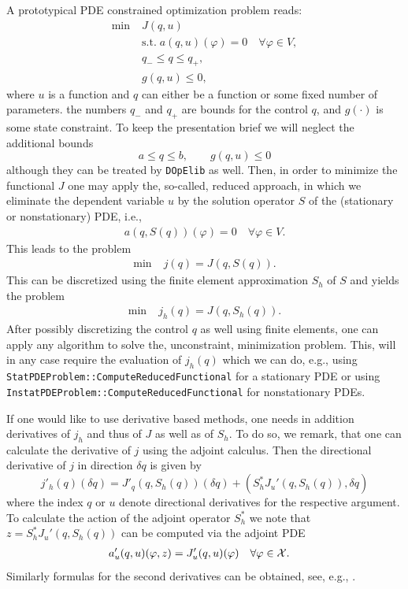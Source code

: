 \documentclass[smallextended]{svjour3}       %
\numberwithin{equation}{section}
\renewcommand{\phi}{\varphi}
\newcommand{\dope}{\texttt{DOpElib}}
\begin{document}
A prototypical PDE constrained optimization problem reads:
\begin{align*}
\min\;&J(q,u) \\
  &\text{s.t.}\; a(q,u)(\phi) = 0 \quad \forall \phi\in V,\\
  &q_- \le q \le q_+,\\
  &g(q,u) \le 0,  
\end{align*}
where $u$ is a function and $q$ can either be a function or some 
fixed number of parameters. the numbers $q_-$ and $q_+$ are bounds for 
the control $q$, and $g(\cdot)$ is some state constraint.
To keep the presentation brief we will neglect the additional bounds
\[
a \le q \le b,\qquad g(q,u) \le 0
\]
although they can be treated by \dope{} as well.
Then, in order to minimize the functional $J$ one may apply the, so-called, 
reduced approach, in which we eliminate the dependent variable $u$ by the solution 
operator $S$ of the (stationary or nonstationary) PDE, i.e., 
\begin{align*}
a(q,S(q))(\phi) = 0 \quad \forall \phi\in V. 
\end{align*}
This leads to the problem
\begin{align*}
\min\;&j(q) = J(q,S(q)). 
\end{align*}
This can be discretized using the finite element approximation $S_h$ of $S$ 
and yields the problem 
\begin{align*}
\min\;&j_h(q) = J(q,S_h(q)). 
\end{align*}
After possibly discretizing the control $q$ as well using finite elements, 
one can apply any algorithm to solve the, unconstraint, minimization 
problem. This, will in any case require the evaluation of $j_h(q)$ which 
we can do, e.g., using \texttt{StatPDEProblem::ComputeReducedFunctional} for 
a stationary PDE or using \texttt{InstatPDEProblem::ComputeReducedFunctional} 
for nonstationary PDEs. 

If one would like to use derivative based methods, one 
needs in addition derivatives of $j_h$ and thus of $J$ as well as of $S_h$. 
To do so, we remark, that one can calculate the derivative of 
$j$ using the adjoint calculus. Then the directional derivative 
of $j$ in direction $\delta q$ is given by
\[
j'_h(q)(\delta q) = J'_q(q,S_h(q))(\delta q) + (S_h^* J_u'(q,S_h(q)),\delta q)
\]
where the index $q$ or $u$ denote directional derivatives for the 
respective argument. To calculate the action of the adjoint operator $S_h^*$ 
we note that $z =  S_h^* J_u'(q,S_h(q))$
can be computed via the adjoint PDE
\begin{equation}
  \label{opt_KKT_system}
  \begin{aligned}
    a_{u}'(q,u)(\phi , z) &= J'_{u}(q,u)(\phi) & \forall \phi&\in {\cal X}.
  \end{aligned}
\end{equation}
Similarly formulas for the second derivatives can be obtained, see, e.g., 
\cite{BeMeVe06}.
\end{document}
